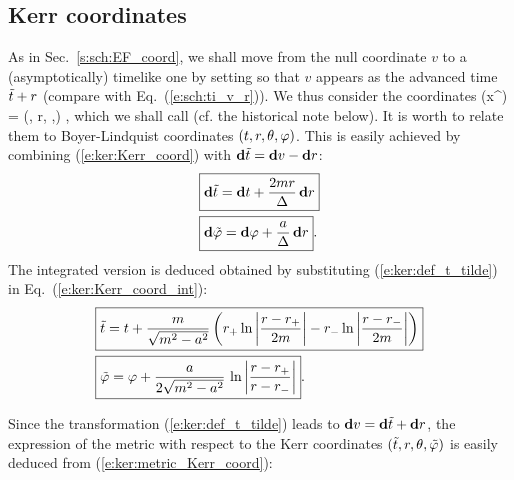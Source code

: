 \subsection{Kerr coordinates} \label{s:ker:3p1_Kerr_coord}

As in Sec.~\ref{s:sch:EF_coord},
we shall move from the null coordinate $v$ to a (asymptotically)
timelike one by setting
\be \label{e:ker:def_t_tilde}
     \iff {}
\ee
so that $v$ appears as the advanced time ${\tilde t}+r$ (compare with Eq.~(\ref{e:sch:ti_v_r})). We thus consider
the coordinates
\be
    (x^{\tilde{\alpha}}) = (\ti, r, \th,\tph) ,
\ee
which we shall call
(cf. the historical note below).
It is worth to relate them to Boyer-Lindquist coordinates
$(t,r,\theta,\varphi)$. This is easily achieved
by combining (\ref{e:ker:Kerr_coord}) with $\mathbf{d}{\tilde t} = \mathbf{d} v - \mathbf{d} r$:
\begin{subequations}
\label{e:ker:Kerr_3p1_BL}
\begin{align}
& \fbox{$\displaystyle \mathbf{d} {\tilde t} = \mathbf{d} t + \frac{2m r}{\Delta} \, \mathbf{d} r$} \\
& \fbox{$\displaystyle \mathbf{d} {\tilde\varphi} = \mathbf{d} \varphi + \frac{a}{\Delta}\, \mathbf{d} r$} .
\end{align}
\end{subequations}
The integrated version is deduced obtained by substituting (\ref{e:ker:def_t_tilde}) in
Eq.~(\ref{e:ker:Kerr_coord_int}):
\begin{subequations}
\label{e:ker:Kerr_3p1_BL_int}
\begin{align}
& \fbox{$\displaystyle {\tilde t} = t  + \frac{m}{\sqrt{m^2-a^2}} \left(
    r_+ \ln\left| \frac{r-r_+}{2m} \right|
    - r_- \ln\left| \frac{r-r_-}{2m} \right| \right) $} \label{e:ker:ti_t}\\
& \fbox{$\displaystyle  {\tilde\varphi} = \varphi + \frac{a}{2\sqrt{m^2-a^2}}\, \ln \left|
    \frac{r-r_+}{r-r_-} \right| $} .
\end{align}
\end{subequations}


Since the transformation (\ref{e:ker:def_t_tilde}) leads to $\mathbf{d} v = \mathbf{d}{\tilde t} + \mathbf{d} r$,
the expression of the metric with respect to the
Kerr coordinates $({\tilde t},r,\theta,{\tilde\varphi})$ is easily deduced from
(\ref{e:ker:metric_Kerr_coord}):
\be \label{e:ker:metric_Kerr_3p1}
\ee

